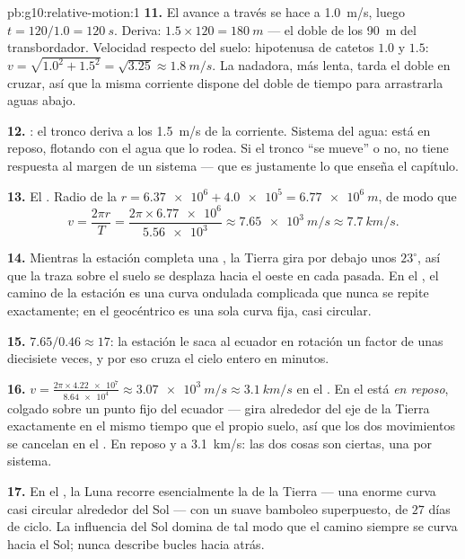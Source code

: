 \begin{solution}{pb:g10:relative-motion:1}
\textbf{11.} El avance a través se hace a \qty{1.0}{m/s}, luego
$t = 120/1.0 = \qty{120}{s}$. Deriva:
$1.5 \times 120 = \qty{180}{m}$ --- el doble de los \qty{90}{m} del
transbordador. Velocidad respecto del suelo: hipotenusa de catetos $1.0$
y $1.5$: $v = \sqrt{1.0^2 + 1.5^2} = \sqrt{3.25} \approx \qty{1.8}{m/s}$.
La nadadora, más lenta, tarda el doble en cruzar, así que la misma
corriente dispone del doble de tiempo para arrastrarla aguas abajo.

\textbf{12.} : el tronco deriva a los \qty{1.5}{m/s} de
la corriente. Sistema del agua: está en reposo, flotando con el agua que
lo rodea. Si el tronco ``se mueve'' o no, no tiene respuesta al margen
de un sistema --- que es justamente lo que enseña el capítulo.

\textbf{13.} El . Radio de la 
$r = \num{6.37e6} + \num{4.0e5} = \qty{6.77e6}{m}$, de modo que
\[
v = \frac{2\pi r}{T} = \frac{2\pi \times \num{6.77e6}}{\num{5.56e3}}
\approx \qty{7.65e3}{m/s} \approx \qty{7.7}{km/s}.
\]

\textbf{14.} Mientras la estación completa una , la Tierra gira
por debajo unos $23^\circ$, así que la traza sobre el suelo se desplaza
hacia el oeste en cada pasada. En el , el camino de la
estación es una curva ondulada complicada que nunca se repite
exactamente; en el geocéntrico es una sola curva fija, casi circular.

\textbf{15.} $7.65 / 0.46 \approx 17$: la estación le saca al ecuador en
rotación un factor de unas diecisiete veces, y por eso cruza el cielo
entero en minutos.

\textbf{16.} $v = \frac{2\pi \times \num{4.22e7}}{\num{8.64e4}}
\approx \qty{3.07e3}{m/s} \approx \qty{3.1}{km/s}$ en el . En el  está \emph{en reposo}, colgado
sobre un punto fijo del ecuador --- gira alrededor del eje de la Tierra
exactamente en el mismo tiempo que el propio suelo, así que los dos
movimientos se cancelan en el . En reposo y a
\qty{3.1}{km/s}: las dos cosas son ciertas, una por sistema.

\textbf{17.} En el , la Luna recorre esencialmente
la  de la Tierra --- una enorme curva casi circular alrededor del
Sol --- con un suave bamboleo superpuesto, de $27$ días de ciclo. La
influencia del Sol domina de tal modo que el camino siempre se curva
hacia el Sol; nunca describe bucles hacia atrás.


\end{solution}
